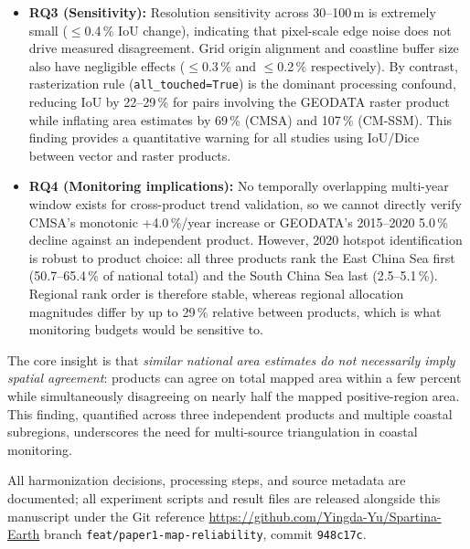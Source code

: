 \documentclass[11pt]{article}
\begin{document}
\begin{itemize}[nosep]
  cannot be established as the sole cause without reference data; and a
  coverage-normalized IoU is not computable from the delivered entities,
  so all agreement is measured on the shared domain under an explicit
  "not mapped as presence == absence" assumption.
\item \textbf{RQ3 (Sensitivity):} Resolution sensitivity across 30--100\,m is
  extremely small ($\leq$0.4\,\% IoU change), indicating that pixel-scale edge
  noise does not drive measured disagreement. Grid origin alignment and
  coastline buffer size also have negligible effects ($\leq$0.3\,\% and
  $\leq$0.2\,\% respectively). By contrast, rasterization rule
  (\texttt{all\_touched=True}) is the dominant processing confound, reducing
  IoU by 22--29\,\% for pairs involving the GEODATA raster product while
  inflating area estimates by 69\,\% (CMSA) and 107\,\% (CM-SSM). This finding
  provides a quantitative warning for all studies using IoU/Dice between
  vector and raster products.
\item \textbf{RQ4 (Monitoring implications):} No temporally overlapping
  multi-year window exists for cross-product trend validation, so we cannot
  directly verify CMSA's monotonic +4.0\,\%/year increase or GEODATA's
  2015--2020 5.0\,\% decline against an independent product. However, 2020
  hotspot identification is robust to product choice: all three products rank
  the East China Sea first (50.7--65.4\,\% of national total) and the South
  China Sea last (2.5--5.1\,\%). Regional rank order is therefore stable,
  whereas regional allocation magnitudes differ by up to 29\,\% relative
  between products, which is what monitoring budgets would be sensitive to.
\end{itemize}

The core insight is that \emph{similar national area estimates do not necessarily
imply spatial agreement}: products can agree on total mapped area within a few
percent while simultaneously disagreeing on nearly half the mapped positive-region
area. This finding, quantified across three independent products and multiple
coastal subregions, underscores the need for multi-source triangulation in
coastal monitoring.

All harmonization decisions, processing steps, and source metadata are
documented; all experiment scripts and result files are released alongside
this manuscript under the Git reference
\url{https://github.com/Yingda-Yu/Spartina-Earth} branch
\texttt{feat/paper1-map-reliability}, commit \texttt{948c17c}.
\end{document}
